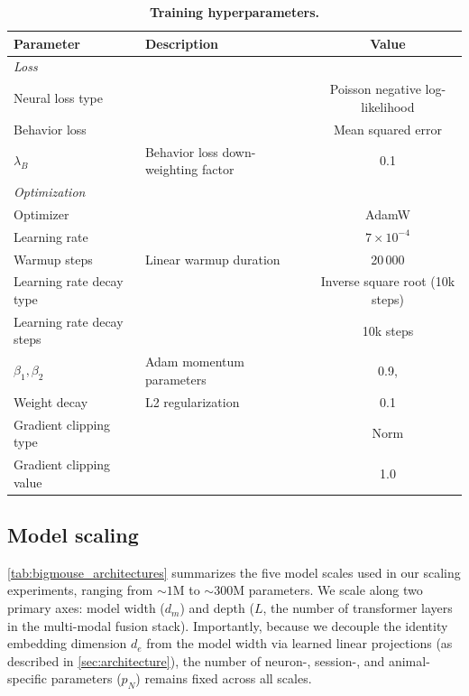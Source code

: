\documentclass{article} %
\begin{document}
\begin{table}[H]
\centering
\caption{\textbf{Training hyperparameters.}}
\label{tab:hparams_training}
\vspace{4pt}
\small
\renewcommand{\arraystretch}{1.15}
\begin{tabular}{llc}
\toprule
\textbf{Parameter} & \textbf{Description} & \textbf{Value} \\
\midrule
\multicolumn{3}{l}{\textit{Loss}} \\
\quad Neural loss type &  & Poisson negative log-likelihood \\
\quad Behavior loss & & Mean squared error \\
\quad $\lambda_B$ & Behavior loss down-weighting factor & 0.1 \\
\midrule
\multicolumn{3}{l}{\textit{Optimization}} \\
\quad Optimizer & & AdamW \\
\quad Learning rate &  & $7 \times 10^{-4}$ \\
\quad Warmup steps & Linear warmup duration & 20\,000 \\
\quad Learning rate decay type &  & Inverse square root (10k steps) \\
\quad Learning rate decay steps &  & 10k steps \\
\quad $\beta_1, \beta_2$ & Adam momentum parameters & 0.9,\; 0.98 \\
\quad Weight decay & L2 regularization & 0.1 \\
\quad Gradient clipping type &  & Norm \\
\quad Gradient clipping value & & 1.0 \\
\bottomrule
\end{tabular}
\end{table}

\vspace{12pt}

\subsection{Model scaling}
\label{sec:appendix_scaling_variants}

\cref{tab:bigmouse_architectures} summarizes the five model scales used in our scaling experiments, ranging from $\sim 1\text{M}$ to $\sim 300\text{M}$ parameters. We scale along two primary axes: model width ($d_m$) and depth ($L$, the number of transformer layers in the multi-modal fusion stack). Importantly, because we decouple the identity embedding dimension $d_e$ from the model width via learned linear projections (as described in \cref{sec:architecture}), the number of neuron-, session-, and animal-specific parameters ($p_N$) remains fixed across all scales.
\end{document}
